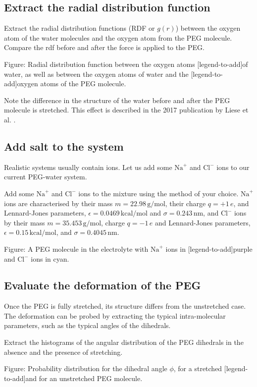 \subsection{Extract the radial distribution function}
\noindent Extract the radial distribution functions (RDF or $g(r)$)
between the oxygen atom of the water molecules
and the oxygen atom from the PEG molecule. Compare the rdf
before and after the force is applied to the PEG.

\vspace{0.25cm} Figure: Radial distribution function between the oxygen atoms 
[legend-to-add]of water, as well as between the oxygen atoms of water and the 
[legend-to-add]oxygen atoms of the PEG molecule.  

\vspace{0.25cm} \noindent Note the difference in the structure of the water before and after
the PEG molecule is stretched. This effect is described in
the 2017 publication by Liese et al. \cite{liese2017hydration}.

\subsection{Add salt to the system}
\noindent Realistic systems usually contain ions. Let us add some $\text{Na}^+$ and 
$\text{Cl}^-$ ions to our current PEG-water system.

\vspace{0.25cm} \noindent Add some $\text{Na}^+$ and 
$\text{Cl}^-$ ions to the mixture using the method
of your choice. $\text{Na}^+$ ions are 
characterised by their mass $m = 22.98\,\text{g/mol}$,
their charge $q = +1\,e$, and Lennard-Jones
parameters, $\epsilon = 0.0469\,\text{kcal/mol}$
and $\sigma = 0.243\,\text{nm}$,
and $\text{Cl}^-$ ions by their
mass $m = 35.453\,\text{g/mol}$,
charge $q = -1\,e$ and Lennard-Jones
parameters, $\epsilon = 0.15\,\text{kcal/mol}$,
and $\sigma = 0.4045\,\text{nm}$.

\vspace{0.25cm} Figure: A PEG molecule in the electrolyte with $\text{Na}^+$ ions in 
[legend-to-add]purple and $\text{Cl}^-$ ions in cyan.

\subsection{Evaluate the deformation of the PEG}
\noindent Once the PEG is fully stretched, its structure differs from the
unstretched case. The deformation can be probed by extracting the typical
intra-molecular parameters, such as the typical angles of the dihedrals.

\vspace{0.25cm} \noindent Extract the histograms of the angular distribution of the PEG dihedrals
in the absence and the presence of stretching.

\vspace{0.25cm} Figure: Probability distribution for the dihedral angle $\phi$, for a stretched
[legend-to-add]and for an unstretched PEG molecule.

